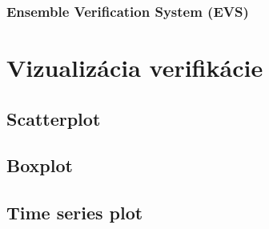 \subsubsection[EVS]{Ensemble Verification System (EVS)}



\section{Vizualizácia verifikácie}

\subsection{Scatterplot}

\subsection{Boxplot}

\subsection{Time series plot}